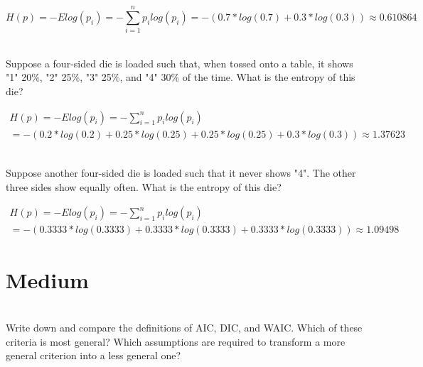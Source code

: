 \documentclass[12pt]{article}\usepackage[]{graphicx}\usepackage[]{color}
\newenvironment{problem}[2][Problem]{\begin{trivlist}
\item[\hskip \labelsep {\bfseries #1}\hskip \labelsep {\bfseries #2.}]}{\end{trivlist}}
\begin{document}
$$H(p) = -Elog(p_i) = -\sum_{i=1}^{n} p_ilog(p_i) = -(0.7*log(0.7) + 0.3*log(0.3)) \approx 0.610864$$

\begin{problem}{6E3}
\text{ }\\
Suppose a four-sided die is loaded such that, when tossed onto a table, it shows "1" 20\%, "2" 25\%, "3" 25\%, and "4" 30\% of the time. What is the entropy of this die?
\end{problem}

\begin{multline*}
H(p) = -Elog(p_i) = -\sum_{i=1}^{n} p_ilog(p_i) \\ = -(0.2*log(0.2) + 0.25*log(0.25) + 0.25*log(0.25) + 0.3*log(0.3)) \approx 1.37623
\end{multline*}

\begin{problem}{6E4}
\text{ }\\
Suppose another four-sided die is loaded such that it never shows "4". The other three sides show equally often. What is the entropy of this die?
\end{problem}

\begin{multline*}
H(p) = -Elog(p_i) = -\sum_{i=1}^{n} p_ilog(p_i) \\ = -(0.3333*log(0.3333) + 0.3333*log(0.3333) + 0.3333*log(0.3333)) \approx 1.09498
\end{multline*}

\section{Medium}

\begin{problem}{6M1}
\text{ }\\
Write down and compare the definitions of AIC, DIC, and WAIC. Which of these criteria is most general? Which assumptions are required to transform a more general criterion into a less general one?
\end{problem}
\end{document}
